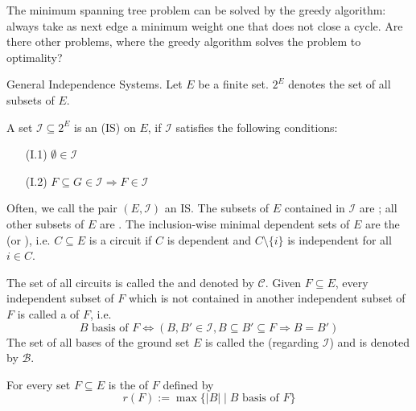 \begin{lec}[2011-02-02]\end{lec}


\begin{qstn}
The minimum spanning tree problem can be solved by the greedy algorithm:
always take as next edge a minimum weight one that does not close a cycle.
Are there other problems, where the greedy algorithm solves the problem to
optimality?

General Independence Systems.
Let $E$ be a finite set. $2^E$ denotes the set of all subsets of $E$.
\end{qstn}

\begin{defn} %
A set $\mathcal{I}\subseteq 2^E$ is an  (IS) on $E$, if $\mathcal{I}$ satisfies the following
conditions:
\begin{itemize}
\item[(I.1)] $\emptyset \in \mathcal{I}$
\item[(I.2)] $F \subseteq G \in \mathcal{I}\Rightarrow F \in \mathcal{I}$
\end{itemize}
Often, we call the pair $(E, \mathcal{I})$ an IS. The subsets of $E$ contained in
$\mathcal{I}$ are ; all other subsets of
$E$ are . The inclusion-wise minimal
dependent sets of $E$ are the  (or ), i.e. $C
\subseteq E$ is a circuit if $C$ is dependent and $C \setminus \{i\}$ is
independent for all $i \in C$.

The set of all circuits is called the  and denoted by
$\mathcal{C}$. Given $F \subseteq E$, every independent subset of $F$ which
is not contained in another independent subset of $F$ is called a
 of $F$, i.e.
\[
	B \text{ basis of } F \Leftrightarrow (B, B' \in \mathcal{I}, B \subseteq B'
	\subseteq F \Rightarrow B = B')
\]
The set of all bases of the ground set $E$ is called the  (regarding $\mathcal{I}$) and is denoted by $\mathcal{B}$.

For every set $F \subseteq E$ is the  of $F$ defined by
\[
	r(F) := \max \{ |B| \mid B \text{ basis of } F \}
\]
\end{defn}

